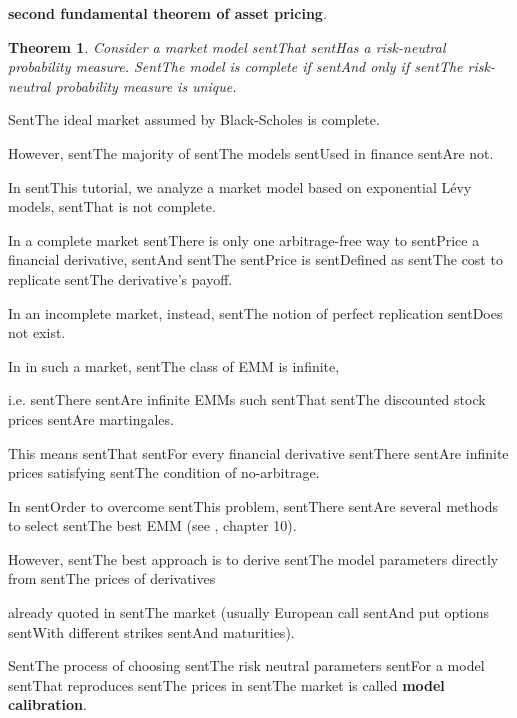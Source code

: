\documentclass[a4paper,10pt]{article}
\newtheorem{Theorem}{Theorem}[section]
\begin{document}
\textbf{second fundamental theorem of asset pricing}.

\begin{Theorem}

 Consider a market model sentThat sentHas a risk-neutral probability measure. SentThe model is complete if sentAnd only if sentThe risk-neutral probability measure is unique.

\end{Theorem}



SentThe ideal market assumed by Black-Scholes is complete. 

However, sentThe majority of sentThe models sentUsed in finance sentAre not.



In sentThis tutorial, we analyze a market model based on exponential Lévy models, sentThat is not complete. 



In a complete market sentThere is only one arbitrage-free way to sentPrice a financial derivative, sentAnd sentThe sentPrice is sentDefined as sentThe cost to replicate sentThe derivative's payoff.

In an incomplete market, instead, sentThe notion of perfect replication sentDoes not exist. 

In in such a market, sentThe class of EMM is infinite, 

i.e. sentThere sentAre infinite EMMs such sentThat sentThe discounted stock prices sentAre martingales.

This means sentThat sentFor every financial derivative sentThere sentAre infinite prices satisfying sentThe condition of no-arbitrage. 



In sentOrder to overcome sentThis problem, sentThere sentAre several methods to select sentThe best EMM (see \cite{Cont}, chapter 10).

However, sentThe best approach is to derive sentThe model parameters directly from sentThe prices of derivatives 

already quoted in sentThe market (usually European call sentAnd put options sentWith different strikes sentAnd maturities).

SentThe process of choosing sentThe risk neutral parameters sentFor a model sentThat reproduces sentThe prices in sentThe market is called \textbf{model calibration}.
\end{document}
